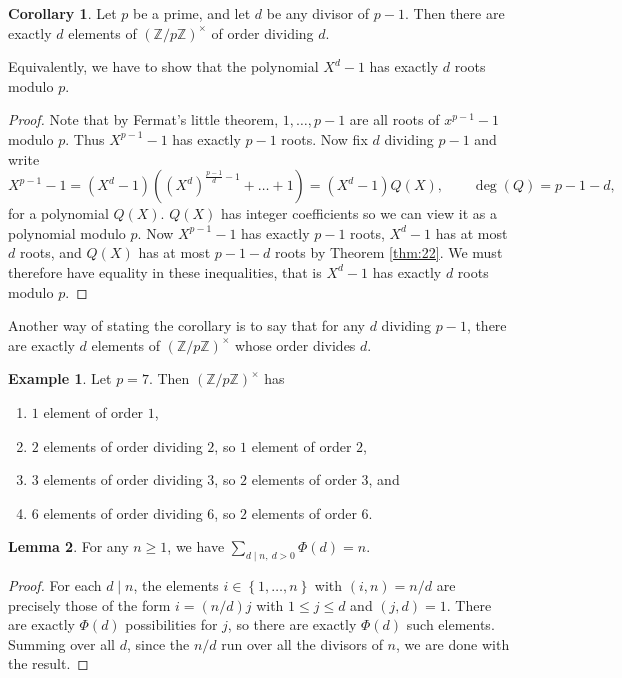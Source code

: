 \documentclass{article}
\newcommand{\Z}{\mathbb{Z}}
\newcommand{\rb}[1]{\left( #1 \right)}
\newcommand{\cb}[1]{\left\{ #1 \right\}}
\newcommand{\unit}[1]{\rb{\Z / #1\Z}^\times}
\theoremstyle{definition}\newtheorem{definition}{Definition}
\theoremstyle{definition}\newtheorem{remark}[definition]{Remark}
\theoremstyle{definition}\newtheorem*{example}{Example}
\theoremstyle{definition}\newtheorem*{note}{Note}
\newtheorem{lemma}[definition]{Lemma}
\newtheorem{corollary}[definition]{Corollary}
\begin{document}
\begin{corollary}
\label{cor:23}
Let $ p $ be a prime, and let $ d $ be any divisor of $ p - 1 $. Then there are exactly $ d $ elements of $ \unit{p} $ of order dividing $ d $.
\end{corollary}

Equivalently, we have to show that the polynomial $ X^d - 1 $ has exactly $ d $ roots modulo $ p $.

\begin{proof}
Note that by Fermat's little theorem, $ 1, \dots, p - 1 $ are all roots of $ x^{p - 1} - 1 $ modulo $ p $. Thus $ X^{p - 1} - 1 $ has exactly $ p - 1 $ roots. Now fix $ d $ dividing $ p - 1 $ and write
$$ X^{p - 1} - 1 = \rb{X^d - 1}\rb{\rb{X^d}^{\tfrac{p - 1}{d} - 1} + \dots + 1} = \rb{X^d - 1}Q\rb{X}, \qquad \deg\rb{Q} = p - 1 - d, $$
for a polynomial $ Q\rb{X} $. $ Q\rb{X} $ has integer coefficients so we can view it as a polynomial modulo $ p $. Now $ X^{p - 1} - 1 $ has exactly $ p - 1 $ roots, $ X^d - 1 $ has at most $ d $ roots, and $ Q\rb{X} $ has at most $ p - 1 - d $ roots by Theorem \ref{thm:22}. We must therefore have equality in these inequalities, that is $ X^d - 1 $ has exactly $ d $ roots modulo $ p $.
\end{proof}

Another way of stating the corollary is to say that for any $ d $ dividing $ p - 1 $, there are exactly $ d $ elements of $ \unit{p} $ whose order divides $ d $.

\begin{example}
Let $ p = 7 $. Then $ \unit{p} $ has
\begin{enumerate}
\item $ 1 $ element of order $ 1 $,
\item $ 2 $ elements of order dividing $ 2 $, so $ 1 $ element of order $ 2 $,
\item $ 3 $ elements of order dividing $ 3 $, so $ 2 $ elements of order $ 3 $, and
\item $ 6 $ elements of order dividing $ 6 $, so $ 2 $ elements of order $ 6 $.
\end{enumerate}
\end{example}

\begin{lemma}
\label{lem:24}
For any $ n \ge 1 $, we have $ \sum_{d \mid n, \ d > 0} \Phi\rb{d} = n $.
\end{lemma}

\begin{proof}
For each $ d \mid n $, the elements $ i \in \cb{1, \dots, n} $ with $ \rb{i, n} = n / d $ are precisely those of the form $ i = \rb{n / d}j $ with $ 1 \le j \le d $ and $ \rb{j, d} = 1 $. There are exactly $ \Phi\rb{d} $ possibilities for $ j $, so there are exactly $ \Phi\rb{d} $ such elements. Summing over all $ d $, since the $ n / d $ run over all the divisors of $ n $, we are done with the result.
\end{proof}
\end{document}
